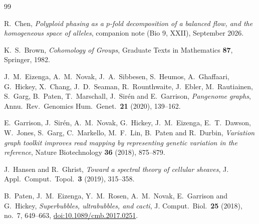 \documentclass[11pt]{article}
\theoremstyle{plain}
\theoremstyle{definition}
\theoremstyle{remark}
\begin{document}
\begin{thebibliography}{99}

 R.~Chen, \emph{Polyploid phasing as a $p$-fold decomposition of a balanced
flow, and the homogeneous space of alleles}, companion note (Bio 9, XXII), September 2026.

 K.~S.~Brown, \emph{Cohomology of Groups}, Graduate Texts in Mathematics
\textbf{87}, Springer, 1982.

 J.~M.~Eizenga, A.~M.~Novak, J.~A.~Sibbesen, S.~Heumos, A.~Ghaffaari,
G.~Hickey, X.~Chang, J.~D.~Seaman, R.~Rounthwaite, J.~Ebler, M.~Rautiainen, S.~Garg,
B.~Paten, T.~Marschall, J.~Sir\'en and E.~Garrison,
\emph{Pangenome graphs},
Annu.\ Rev.\ Genomics Hum.\ Genet.\ \textbf{21} (2020), 139--162.

 E.~Garrison, J.~Sir\'en, A.~M.~Novak, G.~Hickey, J.~M.~Eizenga, E.~T.~Dawson,
W.~Jones, S.~Garg, C.~Markello, M.~F.~Lin, B.~Paten and R.~Durbin,
\emph{Variation graph toolkit improves read mapping by representing genetic variation in the
reference}, Nature Biotechnology \textbf{36} (2018), 875--879.

 J.~Hansen and R.~Ghrist,
\emph{Toward a spectral theory of cellular sheaves},
J. Appl.\ Comput.\ Topol.\ \textbf{3} (2019), 315--358.

 B.~Paten, J.~M.~Eizenga, Y.~M.~Rosen, A.~M.~Novak, E.~Garrison and G.~Hickey,
\emph{Superbubbles, ultrabubbles, and cacti},
J. Comput.\ Biol.\ \textbf{25} (2018), no.~7, 649--663,
\href{https://doi.org/10.1089/cmb.2017.0251}{doi:10.1089/cmb.2017.0251}.

\end{thebibliography}
\end{document}
